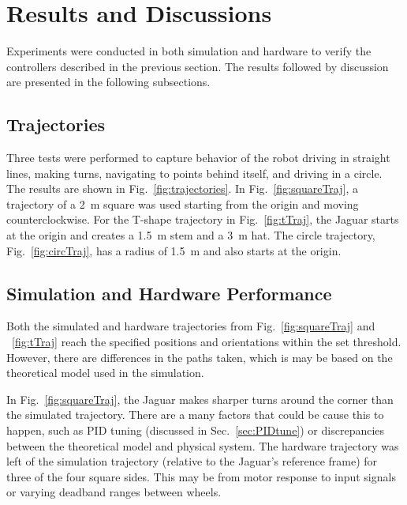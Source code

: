 \documentclass[conference]{../IEEEtran}
\begin{document}
\section{Results and Discussions}

Experiments were conducted in both simulation and hardware to verify the controllers
described in the previous section. The results followed by discussion are presented in the
following subsections.

\subsection{Trajectories}
Three tests were performed to capture behavior of the robot driving in straight lines,
making turns, navigating to points behind itself, and driving in a circle. The results are
shown in Fig.~\ref{fig:trajectories}. In Fig.~\ref{fig:squareTraj}, a trajectory of a
\SI{2}{m} square was used starting from the origin and moving counterclockwise. For the
T-shape trajectory in Fig.~\ref{fig:tTraj}, the Jaguar starts at the origin and creates a
\SI{1.5}{m} stem and a \SI{3}{m} hat. The circle trajectory, Fig.~\ref{fig:circTraj}, has
a radius of \SI{1.5}{m} and also starts at the origin.

\subsection{Simulation and Hardware Performance}
Both the simulated and hardware trajectories from Fig.~\ref{fig:squareTraj} and
~\ref{fig:tTraj} reach the specified positions and orientations within the set threshold.
However, there are differences in the paths taken, which is may be based on the
theoretical model used in the simulation.

In Fig.~\ref{fig:squareTraj}, the Jaguar makes sharper turns around the corner than the
simulated trajectory. There are a many factors that could be cause this to happen, such as
PID tuning (discussed in Sec.~\ref{sec:PIDtune}) or discrepancies between the theoretical
model and physical system. The hardware trajectory was left of the simulation trajectory
(relative to the Jaguar's reference frame) for three of the four square sides. This may be
from motor response to input signals or varying deadband ranges between wheels.
\end{document}
